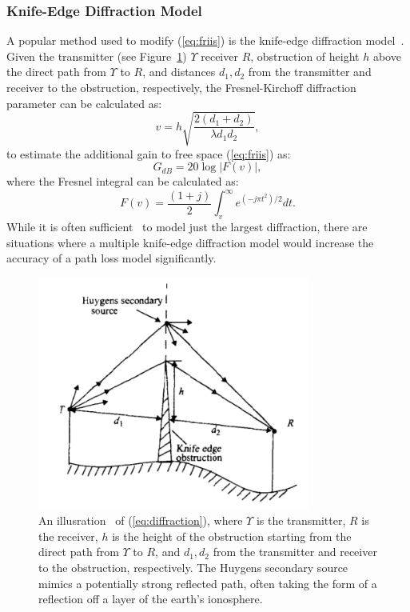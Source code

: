 \subsubsection{Knife-Edge Diffraction Model}
A popular method used to modify (\ref{eq:friis}) is the knife-edge diffraction model~\cite{rappaport1996wireless}. Given the transmitter (see Figure~\ref{fig:knifeedge}) $\Upsilon$ receiver $R$, obstruction of height $h$ above the direct path from $\Upsilon$ to $R$, and distances $d_1, d_2$ from the transmitter and receiver to the obstruction, respectively, the Fresnel-Kirchoff diffraction parameter can be calculated as:
\begin{equation}
\label{eq:v}
v = h\sqrt{\frac{2(d_1+d_2)}{\lambda d_1 d_2}},
\end{equation}
to estimate the additional gain to free space (\ref{eq:friis}) as:
\begin{equation}
\label{eq:diffraction}
G_{dB} = 20 \log |F(v)|,
\end{equation}
where the Fresnel integral can be calculated as:
\begin{equation}
\label{eq:fresnel}
F(v) = \frac{(1+j)}{2} \int_v^{\infty} e^{(-j\pi t^2)/2} dt.
\end{equation}
While it is often sufficient~\cite{rappaport1996wireless} to model just the largest diffraction, there are situations where a multiple knife-edge diffraction model would increase the accuracy of a path loss model significantly. 
\begin{figure}[ht!]
	\centering	\includegraphics[width=0.8\textwidth,keepaspectratio]{figs/knifeedge.png}
    \caption{An illusration~\cite{rappaport1996wireless} of (\ref{eq:diffraction}), where $\Upsilon$ is the transmitter, $R$ is the receiver, $h$ is the height of the obstruction starting from the direct path from $\Upsilon$ to $R$, and $d_1, d_2$ from the transmitter and receiver to the obstruction, respectively. The Huygens secondary source mimics a potentially strong reflected path, often taking the form of a reflection off a layer of the earth's ionosphere.} 
\label{fig:knifeedge}      
\end{figure}
